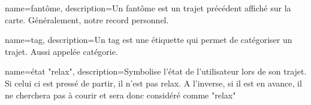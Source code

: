 % 


{
    name=fantôme,
    description={Un fantôme est un trajet précédent affiché sur la carte. Généralement, notre record personnel.}
}

{
    name=tag,
    description={Un tag est une étiquette qui permet de catégoriser un trajet. Aussi appelée catégorie.}
}

{
    name={état "relax"},
    description={Symbolise l'état de l'utilisateur lors de son trajet. Si celui ci est pressé de partir, il n'est pas relax. A l'inverse, si il est en avance, il ne cherchera pas à courir et sera donc considéré comme "relax"}
}


